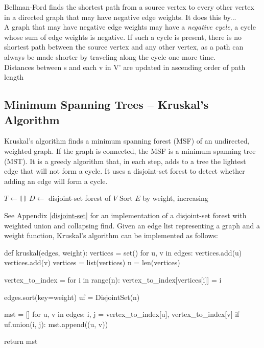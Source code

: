 \documentclass[12pt, titlepage]{article}
\begin{document}
Bellman-Ford finds the shortest path from a source vertex to every other vertex in a directed graph that may have negative edge weights. It does this by... \\

A graph that may have negative edge weights may have a \textit{negative cycle}, a cycle whose sum of edge weights is negative. If such a cycle is present, there is no shortest path between the source vertex and any other vertex, as a path can always be made shorter by traveling along the cycle one more time. \\

Distances between s and each v in V' are updated in ascending order of path length

\subsection{Minimum Spanning Trees -- Kruskal's Algorithm} \label{kruskal}

Kruskal's algorithm finds a minimum spanning forest (MSF) of an undirected, weighted graph. If the graph is connected, the MSF is a minimum spanning tree (MST). It is a greedy algorithm that, in each step, adds to a tree the lightest edge that will not form a cycle. It uses a disjoint-set forest to detect whether adding an edge will form a cycle. \\

\begin{algorithm}[H]
  \SetAlgoLined
  \DontPrintSemicolon
  $T \longleftarrow$\hspace{0.5mm}\texttt{[]}\;
  $D \longleftarrow$\hspace{0.5mm} disjoint-set forest of $V$\;
  Sort $E$ by weight, increasing\;
  \;
  \caption{Kruskal's Algorithm}
\end{algorithm} \medskip

See Appendix \ref{disjoint-set} for an implementation of a disjoint-set forest with weighted union and collapsing find. Given an edge list representing a graph and a weight function, Kruskal's algorithm can be implemented as follows: \medskip

\begin{python}
def kruskal(edges, weight):
    vertices = set()
    for u, v in edges:
        vertices.add(u)
        vertices.add(v)
    vertices = list(vertices)
    n = len(vertices)

    vertex_to_index = {}
    for i in range(n):
        vertex_to_index[vertices[i]] = i

    edges.sort(key=weight)
    uf = DisjointSet(n)

    mst = []
    for u, v in edges:
        i, j = vertex_to_index[u], vertex_to_index[v]
        if uf.union(i, j):
            mst.append((u, v))

    return mst
\end{python}
\end{document}
